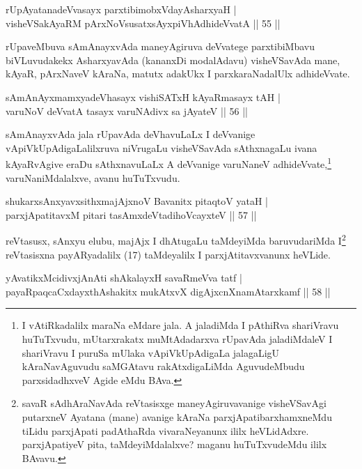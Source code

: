 \begin{shl}
rUpAyatanadeVvasayx parxtibimobxVdayAsharxyaH |\\
visheVSakAyaRM pArxNoV\s susatxsAyxpiVhAdhideVvatA \hfill || 55 ||
\end{shl}

\begin{artha}
rUpaveMbuva sAmAnayxvAda maneyAgiruva deVvatege parxtibiMbavu biVLuvudakekx AsharxyavAda (kananxDi modalAdavu) visheVSavAda mane, kAyaR, pArxNaveV kAraNa, matutx adakUkx I parxkaraNadalUlx adhideVvate.
\end{artha}


\begin{shl}
sAmAnAyxmamxyadeVhasayx vishiSATxH kAyaRmasayx tAH |\\
varuNoV deVvatA tasayx varuNAdivx sa jAyateV \hfill || 56 ||
\end{shl}

\begin{artha}
sAmAnayxvAda jala rUpavAda deVhavuLaLx I deVvanige vApiVkUpAdigaLalilxruva  niVrugaLu visheVSavAda sAthxnagaLu ivana kAyaRvAgive eraDu sAthxnavuLaLx A deVvanige varuNaneV adhideVvate,\footnote[2]{I vAtiRkadalilx maraNa eMdare jala. A jaladiMda I pAthiRva shariVravu huTuTxvudu, mUtarxrakatx muMtAdadarxva rUpavAda jaladiMdaleV I shariVravu I puruSa mUlaka vApiVkUpAdigaLa jalagaLigU kAraNavAguvudu saMGAtavu rakAtxdigaLiMda AguvudeMbudu parxsidadhxveV Agide eMdu BAva.} varuNaniMdalalxve, avanu huTuTxvudu.
\end{artha}

\begin{shl}
shukarxsAnxyavxsithxmajAjxnoV Bavanitx pitaqtoV yataH |\\
parxjApatitavxM pitari tasAmxdeVtadihoVcayxteV \hfill || 57 ||
\end{shl}

\begin{artha}%
reVtasusx, sAnxyu elubu, majAjx I dhAtugaLu taMdeyiMda baruvudariMda I\footnote[1]{savaR sAdhAraNavAda reVtasisxge maneyAgiruvavanige visheVSavAgi putarxneV Ayatana (mane) avanige kAraNa parxjApatibarxhamxneMdu tiLidu parxjApati padAthaRda vivaraNeyanunx ililx heVLidAdxre. parxjApatiyeV pita, taMdeyiMdalalxve? maganu huTuTxvudeMdu ililx BAvavu.} reVtasisxna payARyadalilx (17) taMdeyalilx I parxjAtitavxvanunx heVLide.
\end{artha}

\begin{shl}
yAvatikxMcidivxjAnAti shAkalayxH savaRmeVva tatf |\\
payaRpaqcaCxdayxthAshakitx mukAtxvX digAjxcnXnamAtarxkamf \hfill || 58 ||
\end{shl}

